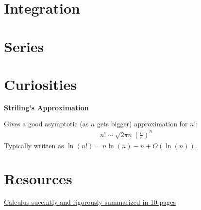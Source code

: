 \documentclass[a4paper, 12pt]{article}
\newcommand{\bt}[1]{\textbf{#1}} %
\newcommand{\eq}[1]{\begin{align*}#1\end{align*}} %
\renewcommand{\eq}[1]{\begin{align*}#1\end{align*}} %
\begin{document}
\section{Integration}

\section{Series}

\section*{Curiosities}

\bt{Striling's Approximation}

Gives a good asymptotic (as $n$ gets bigger) approximation for $n!$:\\

\eq{
n! \sim \sqrt{2\pi n} (\frac{n}{e})^n
}
Typically written as $\ln(n!) = n\ln(n) - n + O(\ln(n))$. 



\section*{Resources}
\href{http://cr.yp.to/papers/calculus.pdf}{Calculus succintly and rigorously summarized in 10 pages}
\end{document}
